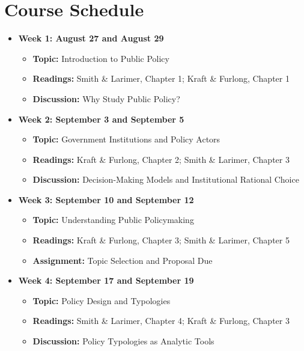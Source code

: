 \documentclass[12pt, letterpaper]{article}
\begin{document}
\section{Course Schedule}

\begin{itemize}
    \item \textbf{Week 1: August 27 and August 29}
    \begin{itemize}
        \item \textbf{Topic:} Introduction to Public Policy
        \item \textbf{Readings:} Smith \& Larimer, Chapter 1; Kraft \& Furlong, Chapter 1
        \item \textbf{Discussion:} Why Study Public Policy?
    \end{itemize}

    \item \textbf{Week 2: September 3 and September 5}
    \begin{itemize}
        \item \textbf{Topic:} Government Institutions and Policy Actors
        \item \textbf{Readings:} Kraft \& Furlong, Chapter 2; Smith \& Larimer, Chapter 3
        \item \textbf{Discussion:} Decision-Making Models and Institutional Rational Choice
    \end{itemize}

    \item \textbf{Week 3: September 10 and September 12}
    \begin{itemize}
        \item \textbf{Topic:} Understanding Public Policymaking
        \item \textbf{Readings:} Kraft \& Furlong, Chapter 3; Smith \& Larimer, Chapter 5
        \item \textbf{Assignment:} Topic Selection and Proposal Due
    \end{itemize}

    \item \textbf{Week 4: September 17 and September 19}
    \begin{itemize}
        \item \textbf{Topic:} Policy Design and Typologies
        \item \textbf{Readings:} Smith \& Larimer, Chapter 4; Kraft \& Furlong, Chapter 3
        \item \textbf{Discussion:} Policy Typologies as Analytic Tools
    \end{itemize}


\end{itemize}
\end{document}
